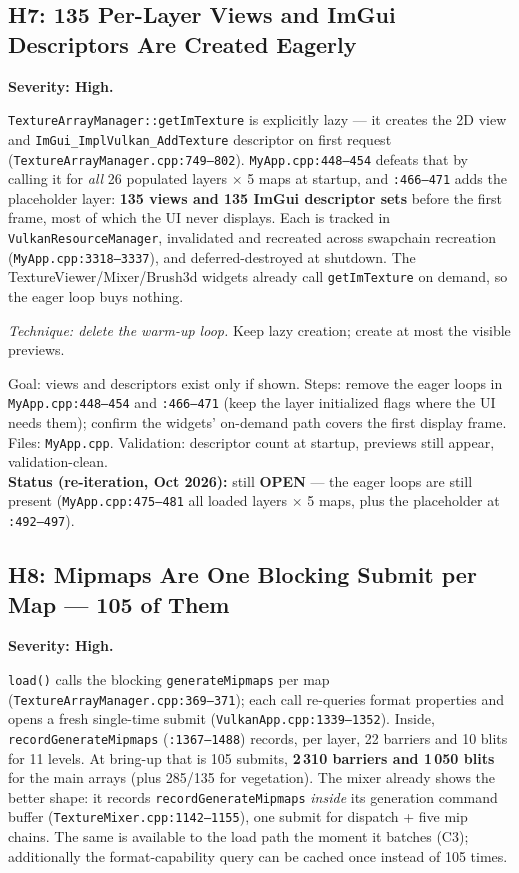 \documentclass[11pt,a4paper]{article}
\begin{document}
\subsection{H7: 135 Per-Layer Views and ImGui Descriptors Are Created Eagerly}
\label{sec:h7}

\textbf{Severity: High.}

\texttt{TextureArrayManager::getImTexture} is explicitly lazy --- it creates the
2D view and \texttt{ImGui\_ImplVulkan\_AddTexture} descriptor on first request
(\texttt{TextureArrayManager.cpp:749--802}). \texttt{MyApp.cpp:448--454} defeats
that by calling it for \emph{all} 26 populated layers $\times$ 5 maps at
startup, and \texttt{:466--471} adds the placeholder layer: \textbf{135 views
and 135 ImGui descriptor sets} before the first frame, most of which the UI
never displays. Each is tracked in \texttt{VulkanResourceManager}, invalidated
and recreated across swapchain recreation (\texttt{MyApp.cpp:3318--3337}), and
deferred-destroyed at shutdown. The TextureViewer/Mixer/Brush3d widgets already
call \texttt{getImTexture} on demand, so the eager loop buys nothing.

\textit{Technique: delete the warm-up loop.} Keep lazy creation; create at most
the visible previews.

\begin{tcolorbox}[promptbox={Prompt --- H7: stop warming every preview}]
Goal: views and descriptors exist only if shown. Steps: remove the eager loops
in \texttt{MyApp.cpp:448--454} and \texttt{:466--471} (keep the layer
initialized flags where the UI needs them); confirm the widgets' on-demand path
covers the first display frame. Files: \texttt{MyApp.cpp}. Validation:
descriptor count at startup, previews still appear, validation-clean.
\\ \textbf{Status (re-iteration, Oct 2026):} still \textbf{OPEN} --- the eager
loops are still present (\texttt{MyApp.cpp:475--481} all loaded layers
$\times$ 5 maps, plus the placeholder at \texttt{:492--497}).
\end{tcolorbox}

\subsection{H8: Mipmaps Are One Blocking Submit per Map --- 105 of Them}
\label{sec:h8}

\textbf{Severity: High.}

\texttt{load()} calls the blocking \texttt{generateMipmaps} per map
(\texttt{TextureArrayManager.cpp:369--371}); each call re-queries format
properties and opens a fresh single-time submit
(\texttt{VulkanApp.cpp:1339--1352}). Inside,
\texttt{recordGenerateMipmaps} (\texttt{:1367--1488}) records, per layer, 22
barriers and 10 blits for 11 levels. At bring-up that is 105 submits,
\textbf{2\,310 barriers and 1\,050 blits} for the main arrays (plus 285/135 for
vegetation). The mixer already shows the better shape: it records
\texttt{recordGenerateMipmaps} \emph{inside} its generation command buffer
(\texttt{TextureMixer.cpp:1142--1155}), one submit for dispatch + five mip
chains. The same is available to the load path the moment it batches (C3);
additionally the format-capability query can be cached once instead of 105
times.
\end{document}
